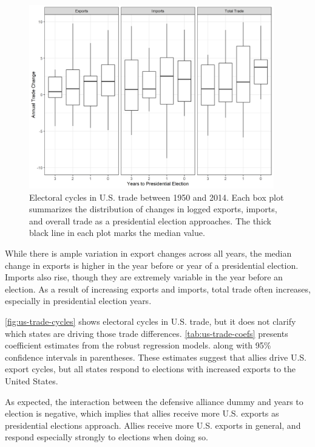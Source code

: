 \documentclass[12pt]{article}
\begin{document}
\begin{figure}
\centering
\includegraphics[width=0.95\textwidth]{../figures/us-trade-cycles.png}
\caption{Electoral cycles in U.S. trade between 1950 and 2014. Each box plot summarizes the distribution of changes in logged exports, imports, and overall trade as a presidential election approaches. The thick black line in each plot marks the median value.}
\label{fig:us-trade-cycles}
\end{figure}


While there is ample variation in export changes across all years, the median change in exports is higher in the year before or year of a presidential election.
Imports also rise, though they are extremely variable in the year before an election. 
As a result of increasing exports and imports, total trade often increases, especially in presidential election years.


\autoref{fig:us-trade-cycles} shows electoral cycles in U.S. trade, but it does not clarify which states are driving those trade differences. 
\autoref{tab:us-trade-coefs} presents coefficient estimates from the robust regression models. along with 95\% confidence intervals in parentheses. 
These estimates suggest that allies drive U.S. export cycles, but all states respond to elections with increased exports to the United States. 





As expected, the interaction between the defensive alliance dummy and years to election is negative, which implies that allies receive more U.S. exports as presidential elections approach.
Allies receive more U.S. exports in general, and respond especially strongly to elections when doing so.
\end{document}
